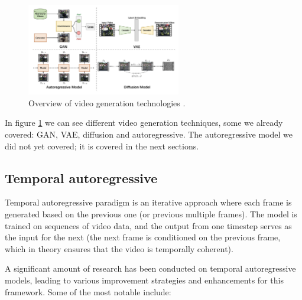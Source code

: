 \begin{figure}
    \centering
    \includegraphics[width=0.6\textwidth]{images/video_synthesis/generation_technologies.png}
    \caption{Overview of video generation technologies \cite{zhou2024survey}.}
    \label{fig:video_synthesis_generation_technologies}
\end{figure}

In figure \ref{fig:video_synthesis_generation_technologies} we can see different video generation techniques, some we already covered: GAN, VAE, diffusion and autoregressive. The autoregressive model we did not yet covered; it is covered in the next sections.








\subsection*{Temporal autoregressive}

Temporal autoregressive paradigm is an iterative approach where each frame is generated based on the previous one (or previous multiple frames). The model is trained on sequences of video data, and the output from one timestep serves as the input for the next (the next frame is conditioned on the previous frame, which in theory ensures that the video is temporally coherent).

A significant amount of research has been conducted on temporal autoregressive models, leading to various improvement strategies and enhancements for this framework. Some of the most notable include:

